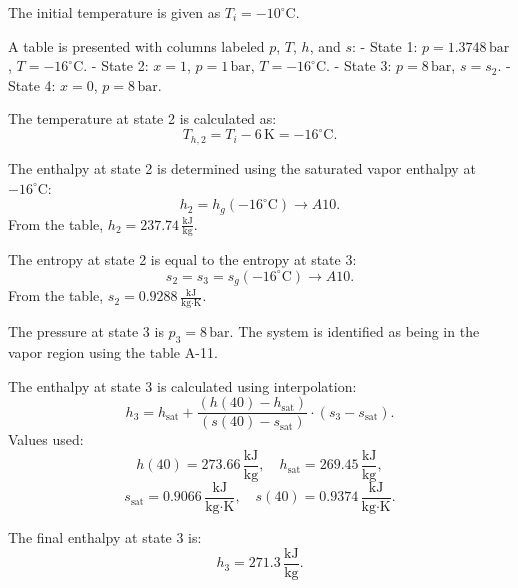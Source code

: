 The initial temperature is given as \( T_i = -10^\circ \text{C} \).  

A table is presented with columns labeled \( p \), \( T \), \( h \), and \( s \):  
- State 1: \( p = 1.3748 \, \text{bar} \), \( T = -16^\circ \text{C} \).  
- State 2: \( x = 1 \), \( p = 1 \, \text{bar} \), \( T = -16^\circ \text{C} \).  
- State 3: \( p = 8 \, \text{bar} \), \( s = s_2 \).  
- State 4: \( x = 0 \), \( p = 8 \, \text{bar} \).  

The temperature at state 2 is calculated as:  
\[
T_{h,2} = T_i - 6 \, \text{K} = -16^\circ \text{C}.
\]  

The enthalpy at state 2 is determined using the saturated vapor enthalpy at \( -16^\circ \text{C} \):  
\[
h_2 = h_g(-16^\circ \text{C}) \rightarrow A10.
\]  
From the table, \( h_2 = 237.74 \, \frac{\text{kJ}}{\text{kg}} \).  

The entropy at state 2 is equal to the entropy at state 3:  
\[
s_2 = s_3 = s_g(-16^\circ \text{C}) \rightarrow A10.
\]  
From the table, \( s_2 = 0.9288 \, \frac{\text{kJ}}{\text{kg·K}} \).  

The pressure at state 3 is \( p_3 = 8 \, \text{bar} \).  
The system is identified as being in the vapor region using the table A-11.  

The enthalpy at state 3 is calculated using interpolation:  
\[
h_3 = h_{\text{sat}} + \frac{(h(40) - h_{\text{sat}})}{(s(40) - s_{\text{sat}})} \cdot (s_3 - s_{\text{sat}}).
\]  
Values used:  
\[
h(40) = 273.66 \, \frac{\text{kJ}}{\text{kg}}, \quad h_{\text{sat}} = 269.45 \, \frac{\text{kJ}}{\text{kg}},  
\]  
\[
s_{\text{sat}} = 0.9066 \, \frac{\text{kJ}}{\text{kg·K}}, \quad s(40) = 0.9374 \, \frac{\text{kJ}}{\text{kg·K}}.
\]  

The final enthalpy at state 3 is:  
\[
h_3 = 271.3 \, \frac{\text{kJ}}{\text{kg}}.
\]